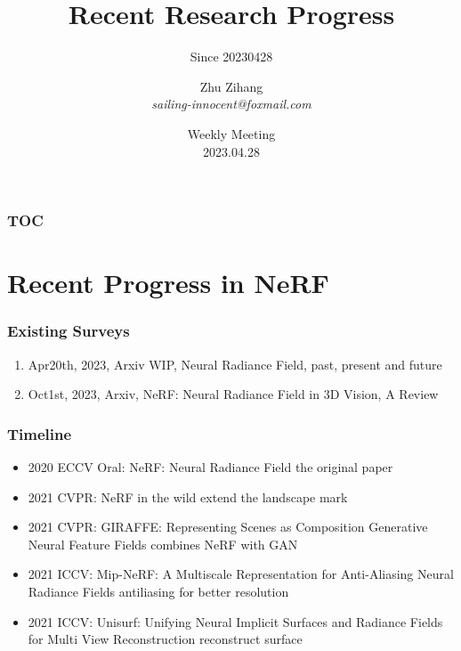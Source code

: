 \documentclass[10pt, hyperref={colorlinks=true,linkcolor=blue},xcolor=dvipsnames]{beamer}
\title[title]{ Recent Research Progress }
\subtitle{Since 20230428}
\author[Zhu Zihang]{\texorpdfstring{Zhu Zihang \\ \smallskip \textit{sailing-innocent@foxmail.com}}{}}
\date[\today]{\texorpdfstring{Weekly Meeting \\ 2023.04.28}{}}
\begin{document}
\begin{frame}
    \titlepage
\end{frame}

\begin{frame}
    \frametitle{TOC}
    \tableofcontents
\end{frame}

\section{Recent Progress in NeRF}

\begin{frame}
    \frametitle{Existing Surveys}
    \begin{enumerate}
        \item Apr20th, 2023, Arxiv WIP, Neural Radiance Field, past, present and future \cite{mittalNeuralRadianceFields2023}
        \item Oct1st, 2023, Arxiv, NeRF: Neural Radiance Field in 3D Vision, A Review \cite{gaoNeRFNeuralRadiance2022}
    \end{enumerate}
\end{frame}

\begin{frame}
    \frametitle{Timeline}
    \begin{itemize}
        \item 2020 ECCV Oral: NeRF: Neural Radiance Field \cite{mildenhallNeRFRepresentingScenes2020} the original paper
        \item 2021 CVPR: NeRF in the wild \cite{martin-bruallaNeRFWildNeural2021} extend the landscape mark
        \item 2021 CVPR: GIRAFFE: Representing Scenes as Composition Generative Neural Feature Fields\cite{niemeyerGIRAFFERepresentingScenes2021} combines NeRF with GAN
        \item 2021 ICCV: Mip-NeRF: A Multiscale Representation for Anti-Aliasing Neural Radiance Fields\cite{barronMipNeRFMultiscaleRepresentation2021} antiliasing for better resolution
        \item 2021 ICCV: Unisurf: Unifying Neural Implicit Surfaces and Radiance Fields for Multi View Reconstruction \cite{oechsleUNISURFUnifyingNeural2021} reconstruct surface
    \end{itemize}
\end{frame}
\end{document}
